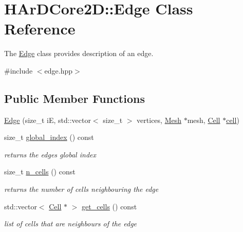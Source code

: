 \hypertarget{classHArDCore2D_1_1Edge}{}\section{H\+Ar\+D\+Core2D\+:\+:Edge Class Reference}
\label{classHArDCore2D_1_1Edge}


The \hyperlink{classHArDCore2D_1_1Edge}{Edge} class provides description of an edge.  




{\ttfamily \#include $<$edge.\+hpp$>$}

\subsection*{Public Member Functions}
\begin{DoxyCompactItemize}
\item 
\hyperlink{classHArDCore2D_1_1Edge_a1bca27244cfcd45e24e0b7485f148ddf}{Edge} (size\+\_\+t iE, std\+::vector$<$ size\+\_\+t $>$ vertices, \hyperlink{classHArDCore2D_1_1Mesh}{Mesh} $\ast$mesh, \hyperlink{classHArDCore2D_1_1Cell}{Cell} $\ast$\hyperlink{classHArDCore2D_1_1Edge_ad4be0bfb981ccf2c1e02e870772dbdc3}{cell})
\item 
size\+\_\+t \hyperlink{group__Mesh_ga774e975ebad5e6bdccf549215293d624}{global\+\_\+index} () const
\begin{DoxyCompactList}\small\item\em returns the edges global index \end{DoxyCompactList}\item 
size\+\_\+t \hyperlink{group__Mesh_ga0926b705b6169b73293e60e0c48e85f8}{n\+\_\+cells} () const
\begin{DoxyCompactList}\small\item\em returns the number of cells neighbouring the edge \end{DoxyCompactList}\item 
\mbox{\label{classHArDCore2D_1_1Edge_a72bedde2003c68d015c70326924b6d7f}} 
std\+::vector$<$ \hyperlink{classHArDCore2D_1_1Cell}{Cell} $\ast$ $>$ \hyperlink{classHArDCore2D_1_1Edge_a72bedde2003c68d015c70326924b6d7f}{get\+\_\+cells} () const
\begin{DoxyCompactList}\small\item\em list of cells that are neighbours of the edge \end{DoxyCompactList}\item 

\end{DoxyCompactItemize}
